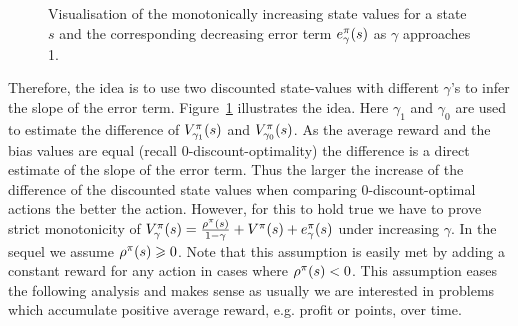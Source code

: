 \documentclass[envcountsame]{llncs}
\begin{document}
\begin{figure*}[t]
  \centering
  \caption{Visualisation of the monotonically increasing state values for a state $s$ and the
    corresponding decreasing error term $e_{\gamma}^{\pi}(s)$ as $\gamma$ approaches 1. }
  \label{fig:e}
\end{figure*}

Therefore, the idea is to use two discounted state-values with different $\gamma$'s to infer the
slope of the error term. Figure~\ref{fig:e} illustrates the idea. Here $\gamma_{1}$ and $\gamma_{0}$
are used to estimate the difference of \(V_{\gamma_{1}}^{\pi}(s)\) and
\(V_{\gamma_{0}}^{\pi}(s)\). As the average reward and the bias values are equal (recall
\(0\)-discount-optimality) the difference is a direct estimate of the slope of the error term. Thus
the larger the increase of the difference of the discounted state values when comparing
\(0\)-discount-optimal actions the better the action. However, for this to hold true we have to
prove strict monotonicity of
\(V_{\gamma}^{\pi}(s) = \frac{\rho^{\pi}(s)}{1-\gamma} + V^{\pi}(s) + e_{\gamma}^{\pi}(s)\)
under increasing $\gamma$. In the sequel we assume \(\rho^{\pi}(s) \geqslant 0\). Note that this
assumption is easily met by adding a constant reward for any action in cases where
\(\rho^{\pi}(s) < 0\). This assumption eases the following analysis and makes sense as usually
we are interested in problems which accumulate positive average reward, e.g. profit or points, over
time.
\end{document}
